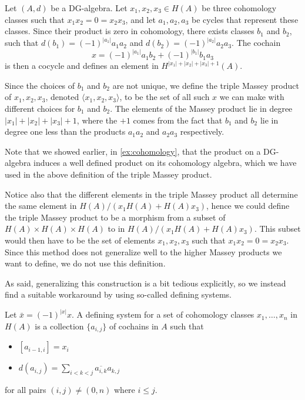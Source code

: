 \begin{definition}
\label{def:triple_massey}
Let $(A,d)$ be a DG-algebra. Let $x_1, x_2, x_3 \in H(A)$ be three cohomology classes such that $x_1 x_2 = 0 = x_2 x_3$, and let $a_1, a_2, a_3$ be cycles that represent these classes. Since their product is zero in cohomology, there exists classes $b_1$ and $b_2$, such that $d(b_1)=(-1)^{|a_1|}a_1a_2$ and $d(b_2)=(-1)^{|a_2|}a_2a_3$. The cochain 
\begin{equation*}
    x = (-1)^{|a_1|}a_1 b_2 + (-1)^{|b_1|}b_1 a_3
\end{equation*}
is then a cocycle and defines an element in $H^{|x_1|+|x_2|+|x_3|+1}(A)$.  

Since the choices of $b_1$ and $b_2$ are not unique, we define the triple Massey product of $x_1, x_2, x_3$, denoted $\langle x_1, x_2, x_3 \rangle$, to be the set of all such $x$ we can make with different choices for $b_1$ and $b_2$. The elements of the Massey product lie in degree $|x_1|+|x_2|+|x_3|+1$, where the $+1$ comes from the fact that $b_1$ and $b_2$ lie in degree one less than the products $a_1 a_2$ and $a_2 a_3$ respectively. 
\end{definition} 

\begin{remark}
Note that we showed earlier, in \cref{ex:cohomology}, that the product on a DG-algebra induces a well defined product on its cohomology algebra, which we have used in the above definition of the triple Massey product.  
\end{remark}

Notice also that the different elements in the triple Massey product all determine the same element in $H(A)/(x_1H(A)+H(A)x_3)$, hence we could define the triple Massey product to be a morphism from a subset of $H(A)\times H(A)\times H(A)$ to in $H(A)/(x_1H(A)+H(A)x_3)$. This subset would then have to be the set of elements $x_1, x_2, x_3$ such that $x_1x_2 = 0 = x_2x_3$. Since this method does not generalize well to the higher Massey products we want to define, we do not use this definition. 

As said, generalizing this construction is a bit tedious explicitly, so we instead find a suitable workaround by using so-called defining systems. 

\begin{definition}
\label{def:defining_system}
Let $\bar{x} = (-1)^{|x|}x$. A defining system for a set of cohomology classes $x_1, \ldots, x_n$ in $ H(A)$ is a collection $\{ a_{i,j}\}$ of cochains in $A$ such that
\begin{itemize}
    \item $[a_{i-1, i}] = x_i$
    \item $d(a_{i, j}) = \displaystyle\sum_{i<k<j}\overline{a_{i, k}}a_{k, j}$
\end{itemize}
for all pairs $(i,j)\neq (0,n)$ where $i\leq j$.
\end{definition}

